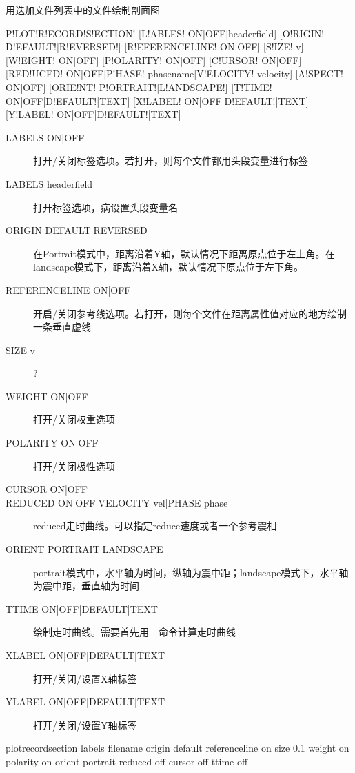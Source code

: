 \label{sss:plotrecordsection}

用迭加文件列表中的文件绘制剖面图

\begin{SACSTX}
P!LOT!R!ECORD!S!ECTION! [L!ABLES! ON|OFF|headerfield] [O!RIGIN! D!EFAULT!|R!EVERSED!]
    [R!EFERENCELINE! ON|OFF] [S!IZE! v] [W!EIGHT! ON|OFF] [P!OLARITY! ON|OFF]
    [C!URSOR! ON|OFF] [RED!UCED! ON|OFF|P!HASE! phasename|V!ELOCITY! velocity]
    [A!SPECT! ON|OFF] [ORIE!NT! P!ORTRAIT!|L!ANDSCAPE!] [T!TIME! ON|OFF|D!EFAULT!|TEXT]
    [X!LABEL! ON|OFF|D!EFAULT!|TEXT] [Y!LABEL! ON|OFF|D!EFAULT!|TEXT]
\end{SACSTX}

\begin{description}
\item [LABELS ON|OFF] 打开/关闭标签选项。若打开，则每个文件都用头段变量进行标签
\item [LABELS headerfield] 打开标签选项，病设置头段变量名
\item [ORIGIN DEFAULT|REVERSED] 在Portrait模式中，距离沿着Y轴，默认情况下距离原点位于左上角。在landscape模式下，距离沿着X轴，默认情况下原点位于左下角。
\item [REFERENCELINE ON|OFF] 开启/关闭参考线选项。若打开，则每个文件在距离属性值对应的地方绘制一条垂直虚线
\item [SIZE v] ?
\item [WEIGHT ON|OFF] 打开/关闭权重选项
\item [POLARITY ON|OFF] 打开/关闭极性选项
\item [CURSOR ON|OFF]
\item [REDUCED ON|OFF|VELOCITY vel|PHASE phase] reduced走时曲线。可以指定reduce速度或者一个参考震相
\item [ORIENT PORTRAIT|LANDSCAPE] portrait模式中，水平轴为时间，纵轴为震中距；landscape模式下，水平轴为震中距，垂直轴为时间
\item [TTIME ON|OFF|DEFAULT|TEXT] 绘制走时曲线。需要首先用~~命令计算走时曲线
\item [XLABEL ON|OFF|DEFAULT|TEXT] 打开/关闭/设置X轴标签
\item [YLABEL ON|OFF|DEFAULT|TEXT] 打开/关闭/设置Y轴标签
\end{description}

\begin{SACDFT}
plotrecordsection labels filename origin default referenceline on size 0.1
    weight on polarity on orient portrait reduced off cursor off ttime off
\end{SACDFT}

